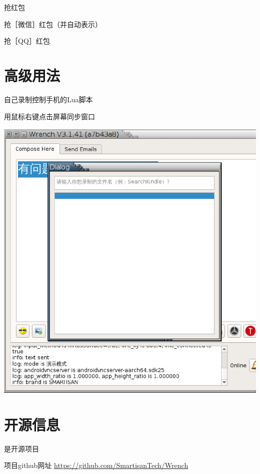 \documentclass[presentation,dvipdfmx,CJKbookmarks]{beamer}
\begin{document}
\begin{CJK*}{UTF8}{simsun}
\begin{frame}[label={sec:org07b704c}]{抢红包}
\begin{block}{抢［微信］红包（并自动表示）}
\end{block}
\begin{block}{抢［QQ］红包}
\end{block}
\end{frame}

\section{高级用法}
\label{sec:orge4938d2}
\begin{frame}[label={sec:orgb8d8c67}]{自己录制控制手机的\thinspace Lua\thinspace 脚本}
\begin{block}{用鼠标右键点击屏幕同步窗口}
\begin{center}
\includegraphics[width=.9\linewidth]{./images/wrench-screen-record.ps}
\end{center}
\end{block}
\end{frame}

\section{开源信息}
\label{sec:org9706b3a}
\begin{frame}[label={sec:org4a60009}]{是开源项目}
\begin{block}{项目\thinspace github\thinspace 网址}
\url{https://github.com/SmartisanTech/Wrench}
\end{block}


\end{frame}
\end{CJK*}
\end{document}
